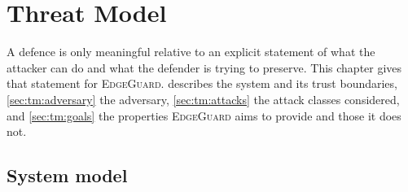 \chapter{Threat Model}
\label{ch:threat}

A defence is only meaningful relative to an explicit statement of what the attacker can do and
what the defender is trying to preserve. This chapter gives that statement for
\textsc{EdgeGuard}.  describes the system and its trust boundaries,
\cref{sec:tm:adversary} the adversary, \cref{sec:tm:attacks} the attack classes considered, and
\cref{sec:tm:goals} the properties \textsc{EdgeGuard} aims to provide and those it does not.

\section{System model}
\label{sec:tm:system}

